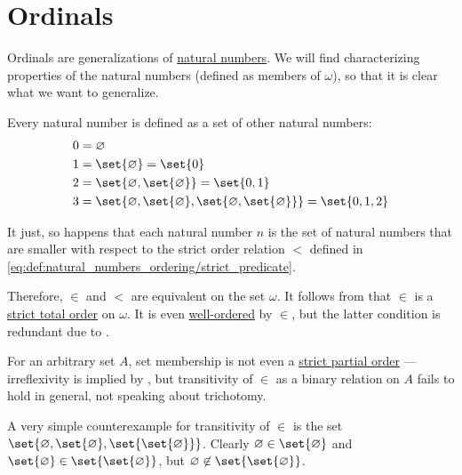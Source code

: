 \section{Ordinals}\label{sec:ordinals}

\begin{remark}\label{rem:ordinal_definition}
  Ordinals are generalizations of \hyperref[def:natural_numbers]{natural numbers}. We will find characterizing properties of the natural numbers (defined as members of \hyperref[thm:smallest_inductive_set_existence]{\( \omega \)}), so that it is clear what we want to generalize.

  Every natural number is defined as a set of other natural numbers:
  \begin{align*}
    &0 = \varnothing \\
    &1 = \set{ \varnothing } = \set{ 0 } \\
    &2 = \set{ \varnothing, \set{ \varnothing } } = \set{ 0, 1 } \\
    &3 = \set{ \varnothing, \set{ \varnothing }, \set{ \varnothing, \set{ \varnothing } } } = \set{ 0, 1, 2 }
  \end{align*}

  It just, so happens that each natural number \( n \) is the set of natural numbers that are smaller with respect to the strict order relation \( < \) defined in \eqref{eq:def:natural_numbers_ordering/strict_predicate}.

  Therefore, \( \in \) and \( < \) are equivalent on the set \( \omega \). It follows from  that \( \in \) is a \hyperref[def:totally_ordered_set]{strict total order} on \( \omega \). It is even \hyperref[def:well_ordered_set]{well-ordered} by \( \in \), but the latter condition is redundant due to .

  For an arbitrary set \( A \), set membership is not even a \hyperref[def:strict_partial_order]{strict partial order} --- irreflexivity is implied by , but transitivity of \( \in \) as a binary relation on \( A \) fails to hold in general, not speaking about trichotomy.

  A very simple counterexample for transitivity of \( \in \) is the set \( \set{ \varnothing, \set{ \varnothing }, \set{ \set{ \varnothing } } } \). Clearly \( \varnothing \in \set{ \varnothing } \) and \( \set{ \varnothing } \in \set{ \set{ \varnothing } } \), but \( \varnothing \not\in \set{ \set{ \varnothing } } \).


\end{remark}
